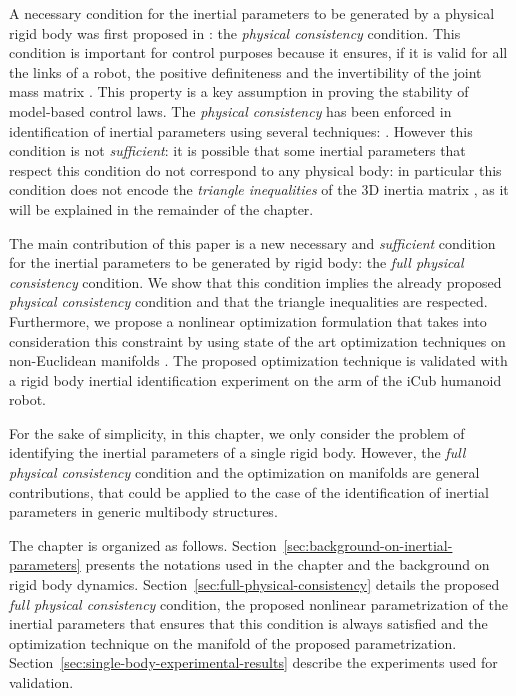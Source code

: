 A necessary condition for the inertial parameters to be generated by a physical rigid body was first proposed in \citep{yoshida1994}: the \emph{physical consistency} condition.  
This condition is important for control purposes because it ensures, if it is valid for all the links of a robot, the positive definiteness and the invertibility of the joint mass matrix \citep{yoshida2000}. This property is a key assumption in proving the stability of model-based control laws. 
The \emph{physical consistency} has been enforced in identification of inertial parameters  using several techniques: \citep{yoshida2000,mata2005,gautier2013industrial,gautier2013positive,sousa2014,jovic2015}. However this condition is not \emph{sufficient}: it is possible that some inertial parameters that respect this condition do not correspond to any physical body: in particular this condition does not encode the \emph{triangle inequalities} of the 3D inertia matrix \cite[Chapter 3]{wittenburg2007dynamics}, as it will be explained in the remainder of the chapter.

The main contribution of this paper is a new necessary and \emph{sufficient} condition for the inertial parameters to be generated by rigid body: the \emph{full physical consistency} condition. We show that this condition implies the already proposed \emph{physical consistency} condition and that the triangle inequalities are respected. Furthermore, we propose a nonlinear optimization formulation that takes into consideration this constraint by using state of the art optimization techniques on non-Euclidean manifolds \citep{brossette2015humanoid}. The proposed optimization technique is validated with a rigid body inertial identification experiment on the arm of the iCub humanoid robot.

For the sake of simplicity, in this chapter, we only consider the problem of identifying the inertial parameters of a single rigid body. However, the \emph{full physical consistency} condition and the optimization on manifolds are general contributions, that could be applied to the case of the identification of inertial parameters in generic multibody structures. 

The chapter is organized as follows. Section~\ref{sec:background-on-inertial-parameters} presents the
notations  used  in  the  chapter and the background on rigid body dynamics.
Section~\ref{sec:full-physical-consistency} details the proposed \emph{full physical consistency} condition, the proposed nonlinear parametrization of the inertial parameters that ensures that this condition is always satisfied and the optimization technique on the manifold of the proposed parametrization.
Section~\ref{sec:single-body-experimental-results} describe the experiments used for validation.

